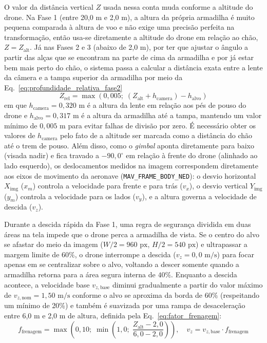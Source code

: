 O valor da distância vertical $Z$ usada nessa conta muda conforme a altitude do drone. Na Fase 1 (entre 20,0 m e 2,0 m), a altura da própria armadilha é muito pequena comparada à altura de voo e não exige uma precisão perfeita na transformação, então usa-se diretamente a altitude do drone em relação ao chão, $Z = Z_{\text{alt}}$. Já nas Fases 2 e 3 (abaixo de 2,0 m), por ter que ajustar o ângulo a partir das alças que se encontram na parte de cima da armadilha e por já estar bem mais perto do chão, o sistema passa a calcular a distância exata entre a lente da câmera e a tampa superior da armadilha por meio da Eq.~\ref{eq:profundidade_relativa_fase2}
\begin{equation}
	Z_{\text{rel}} = \max\left(0{,}005;\; (Z_{\text{alt}} + h_{\text{camera}}) - h_{\text{alvo}}\right)
	\label{eq:profundidade_relativa_fase2}
\end{equation}
em que $h_{\text{camera}} = 0{,}320\text{ m}$ é a altura da lente em relação aos pés de pouso do drone e $h_{\text{alvo}} = 0{,}317\text{ m}$ é a altura da armadilha até a tampa, mantendo um valor mínimo de $0{,}005\text{ m}$ para evitar falhas de divisão por zero. É necessário obter os valores de $h_{\text{camera}}$ pelo fato de a altitude ser marcada como a distância do chão até o trem de pouso. Além disso, como o \textit{gimbal} aponta diretamente para baixo (visada nadir) e fica travado a $-90{,}0^\circ$ em relação à frente do drone (alinhado ao lado esquerdo), os deslocamentos medidos na imagem correspondem diretamente aos eixos de movimento da aeronave (\texttt{MAV\_FRAME\_BODY\_NED}): o desvio horizontal $X_{\text{img}}$ ($x_m$) controla a velocidade para frente e para trás ($v_x$), o desvio vertical $Y_{\text{img}}$ ($y_m$) controla a velocidade para os lados ($v_y$), e a altura governa a velocidade de descida ($v_z$).

Durante a descida rápida da Fase 1, uma regra de segurança dividida em duas áreas na tela impede que o drone perca a armadilha de vista. Se o centro do alvo se afastar do meio da imagem ($W/2 = 960\text{ px}$, $H/2 = 540\text{ px}$) e ultrapassar a margem limite de $60\%$, o drone interrompe a descida ($v_z = 0{,}0\text{ m/s}$) para focar apenas em se centralizar sobre o alvo, voltando a descer somente quando a armadilha retorna para a área segura interna de $40\%$. Enquanto a descida acontece, a velocidade base $v_{z,\text{base}}$ diminui gradualmente a partir do valor máximo de $v_{z,\text{nom}} = 1{,}50\text{ m/s}$ conforme o alvo se aproxima da borda de $60\%$ (respeitando um mínimo de 20\%) e também é suavizada por uma rampa de desaceleração entre 6,0 m e 2,0 m de altura, definida pela Eq.~\ref{eq:fator_frenagem}:
\begin{equation}
	f_{\text{frenagem}} = \max\left(0{,}10;\; \min\left(1{,}0;\; \frac{Z_{\text{alt}} - 2{,}0}{6{,}0 - 2{,}0}\right)\right), \quad v_z = v_{z,\text{base}} \cdot f_{\text{frenagem}}
	\label{eq:fator_frenagem}
\end{equation}

